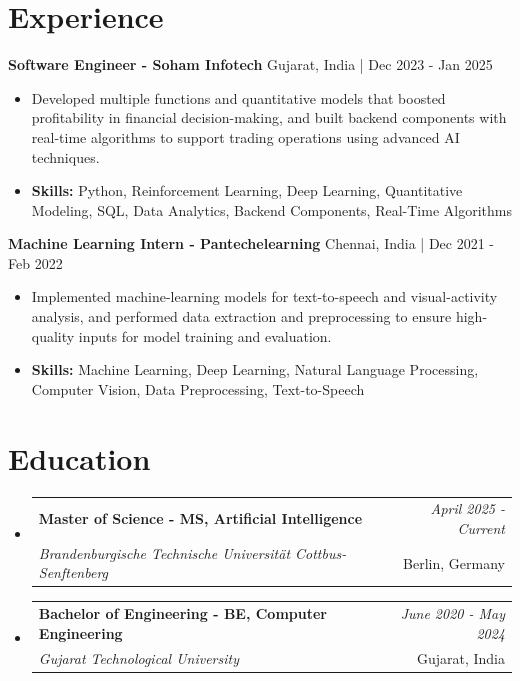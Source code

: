 \documentclass[a4paper,11pt]{article}
\makeatletter
\newcommand{\resumeSubheading}[4]{
\vspace{0.5mm}\item
    \begin{tabular*}{\linewidth}[t]{l@{\extracolsep{\fill}}r}
        \textbf{#1} & \textit{\footnotesize{#4}} \\
        \textit{\footnotesize{#3}} &  \footnotesize{#2}\\
    \end{tabular*}
    \vspace{-2.4mm}
}
\makeatother
\begin{document}
\section{\textbf{Experience}}


\vspace{1mm}
  \textbf{Software Engineer - Soham Infotech} \hfill Gujarat, India | Dec 2023 - Jan 2025
\vspace{-1.5mm} %
\begin{itemize}
  \item Developed multiple functions and quantitative models that boosted profitability in financial decision-making, and built backend components with real-time algorithms to support trading operations using advanced AI techniques.

\vspace{-2mm}
  \item \textbf{Skills:} Python, Reinforcement Learning, Deep Learning, Quantitative Modeling, SQL, Data Analytics, Backend Components, Real-Time Algorithms
\end{itemize}

\vspace{1mm}
  \textbf{Machine Learning Intern - Pantechelearning} \hfill Chennai, India | Dec 2021 - Feb 2022
\vspace{-1.5mm} %
\begin{itemize}
  \item Implemented machine-learning models for text-to-speech and visual-activity analysis, and performed data extraction and preprocessing to ensure high-quality inputs for model training and evaluation.
\vspace{-2mm}
  \item \textbf{Skills:} Machine Learning, Deep Learning, Natural Language Processing, Computer Vision, Data Preprocessing, Text-to-Speech
\end{itemize}\section{\textbf{Education}}
\vspace{-0.4mm}

\begin{itemize}[leftmargin=0.15in, label={}]
\resumeSubheading
{Master of Science - MS, Artificial Intelligence }{Berlin, Germany}
{Brandenburgische Technische Universität Cottbus-Senftenberg  }{April 2025 - Current}

\vspace{1.0mm} %
\resumeSubheading
{Bachelor of Engineering - BE, Computer Engineering  }{Gujarat, India}
{Gujarat Technological University }{June 2020 - May 2024}

\end{itemize}
\end{document}
